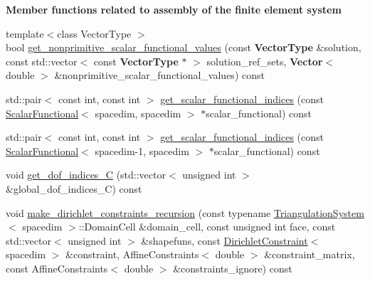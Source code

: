 \begin{Indent}{\bf Member functions related to assembly of the finite element system}
\begin{DoxyCompactItemize}
\item 
{\footnotesize template$<$class Vector\+Type $>$ }\\bool \hyperlink{class_assembly_helper_a5ab3659137ee74754cc27d9c18e1f9db}{get\+\_\+nonprimitive\+\_\+scalar\+\_\+functional\+\_\+values} (const {\bf Vector\+Type} \&solution, const std\+::vector$<$ const {\bf Vector\+Type} $\ast$ $>$ solution\+\_\+ref\+\_\+sets, {\bf Vector}$<$ double $>$ \&nonprimitive\+\_\+scalar\+\_\+functional\+\_\+values) const 
\item 
std\+::pair$<$ const int, const int $>$ \hyperlink{class_assembly_helper_aad795811df548677cb883341f6c52001}{get\+\_\+scalar\+\_\+functional\+\_\+indices} (const \hyperlink{class_scalar_functional}{Scalar\+Functional}$<$ spacedim, spacedim $>$ $\ast$scalar\+\_\+functional) const 
\item 
std\+::pair$<$ const int, const int $>$ \hyperlink{class_assembly_helper_ae5791ac73405d479df790815abc06380}{get\+\_\+scalar\+\_\+functional\+\_\+indices} (const \hyperlink{class_scalar_functional}{Scalar\+Functional}$<$ spacedim-\/1, spacedim $>$ $\ast$scalar\+\_\+functional) const 
\item 
void \hyperlink{class_assembly_helper_a4cc746ddb7917fa0e9f7cdda05345b94}{get\+\_\+dof\+\_\+indices\+\_\+C} (std\+::vector$<$ unsigned int $>$ \&global\+\_\+dof\+\_\+indices\+\_\+C) const 
\item 
void \hyperlink{class_assembly_helper_a5c4d81be4c30b8a40761ac5710734576}{make\+\_\+dirichlet\+\_\+constraints\+\_\+recursion} (const typename \hyperlink{class_triangulation_system}{Triangulation\+System}$<$ spacedim $>$\+::Domain\+Cell \&domain\+\_\+cell, const unsigned int face, const std\+::vector$<$ unsigned int $>$ \&shapefuns, const \hyperlink{class_dirichlet_constraint}{Dirichlet\+Constraint}$<$ spacedim $>$ \&constraint, Affine\+Constraints$<$ double $>$ \&constraint\+\_\+matrix, const Affine\+Constraints$<$ double $>$ \&constraints\+\_\+ignore) const 
\end{DoxyCompactItemize}
\end{Indent}
